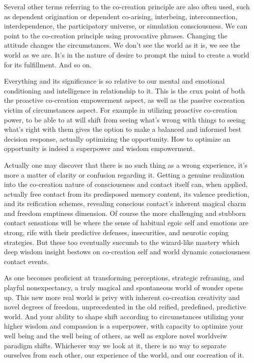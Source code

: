 \documentclass[12pt,openany]{book}
\begin{document}
Several other terms referring to the co-creation principle are also often used, such as dependent origination or dependent co-arising, interbeing, interconnection, interdependence, the participatory universe, or simulation consciousness. We can point to the co-creation principle using provocative phrases. Changing the attitude changes the circumstances. We don’t see the world as it is, we see the world as we are. It’s in the nature of desire to prompt the mind to create a world for its fulfillment. And so on.

Everything and its significance is so relative to our mental and emotional conditioning and intelligence in relationship to it. This is the crux point of both the proactive co-creation empowerment aspect, as well as the passive cocreation victim of circumstances aspect. For example in utilizing proactive co-creation power, to be able to at will shift from seeing what’s wrong with things to seeing what’s right with them gives the option to make a balanced and informed best decision response, actually optimizing the opportunity. How to optimize an opportunity is indeed a superpo\-wer and wisdom empowerment.

Actually one may discover that there is no such thing as a \linebreak wrong experience, it’s more a matter of clarity or confusion regarding it. Getting a genuine realization into the co-creation nature of consciousness and contact itself can, when applied, actually free contact from its predisposed memory content, its valence prediction, and its reification schemes, revealing conscious contact's inherent magical charm and freedom emptiness dimension. Of course the more challenging and stubborn contact sensations will be where the sense of habitual egoic self and emotions are strong, rife with their predictive defenses, insecurities, and neurotic coping strategies. But these too eventually succumb to the wizard-like mastery which deep wisdom insight bestows on co-creation self and world dynamic consciousness contact events.

As one becomes proficient at transforming perceptions, strategic reframing, and playful nonexpectancy, a truly magical and spontaneous world of wonder opens up. This new more real world is privy with inherent co-creation creativity and novel degrees of freedom, unprecedented in the old reified, predefined, predictive world. And your ability to shape shift according to circumstances utilizing your higher wisdom and compassion is a superpower, with capacity to optimize your well being and the well being of others, as well as explore novel worldveiw paradigm shifts. Whichever way we look at it, there is no way to separate ourselves from each other, our experience of the world, and our cocreation of it.
\end{document}
